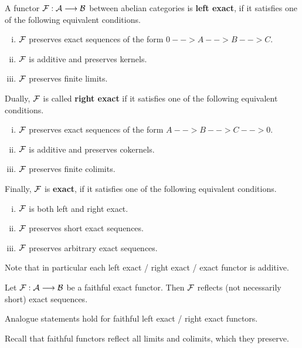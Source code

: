 	\begin{definition}
		A functor $\mathcal{F}: \mathcal{A} --> \mathcal{B}$ between abelian categories is \textbf{left exact}, if it satisfies one of the following equivalent conditions.
		\begin{enumerate}[(i)]
			\item{
				$\mathcal{F}$ preserves exact sequences of the form $0 --> A --> B --> C$.
			}
			\item{
				$\mathcal{F}$ is additive and preserves kernels.
			}
			\item{
				$\mathcal{F}$ preserves finite limits.
			}
		\end{enumerate}

		Dually, $\mathcal{F}$ is called \textbf{right exact} if it satisfies one of the following equivalent conditions.
		\begin{enumerate}[(i)]
			\item{
				$\mathcal{F}$ preserves exact sequences of the form $A --> B --> C --> 0$.
			}
			\item{
				$\mathcal{F}$ is additive and preserves cokernels.
			}
			\item{
				$\mathcal{F}$ preserves finite colimits.
			}
		\end{enumerate}

		Finally, $\mathcal{F}$ is \textbf{exact}, if it satisfies one of the following equivalent conditions.
		\begin{enumerate}[(i)]
			\item{
				$\mathcal{F}$ is both left and right exact.
			}
			\item{
				$\mathcal{F}$ preserves short exact sequences.
			}
			\item{
				$\mathcal{F}$ preserves arbitrary exact sequences.
			}
		\end{enumerate}

		Note that in particular each left exact / right exact / exact functor is additive.
	\end{definition}

	\begin{lemma}
		Let $\mathcal{F}: \mathcal{A} --> \mathcal{B}$ be a faithful exact functor. Then $\mathcal{F}$ reflects (not necessarily short) exact sequences.

		Analogue statements hold for faithful left exact / right exact functors.
	\end{lemma}
	\begin{sketch}
		Recall that faithful functors reflect all limits and colimits, which they preserve.
	\end{sketch}

